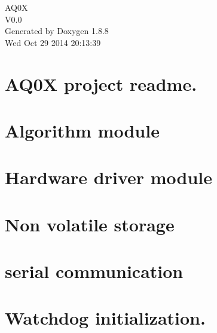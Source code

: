 \documentclass[twoside]{book}
\newcommand{\+}{\discretionary{\mbox{\scriptsize$\hookleftarrow$}}{}{}}
\newcommand{\clearemptydoublepage}{%
  \newpage{\pagestyle{empty}\cleardoublepage}%
}
\begin{document}
\hypersetup{pageanchor=false,
             bookmarks=true,
             bookmarksnumbered=true,
             pdfencoding=unicode
            }
\begin{titlepage}
\vspace*{7cm}
\begin{center}%
{\Large A\+Q0\+X \\[1ex]\large V0.\+0 }\\
\vspace*{1cm}
{\large Generated by Doxygen 1.8.8}\\
\vspace*{0.5cm}
{\small Wed Oct 29 2014 20:13:39}\\
\end{center}
\end{titlepage}
\clearemptydoublepage
\tableofcontents
\clearemptydoublepage
{}
\hypersetup{pageanchor=true}

\chapter{A\+Q0\+X project readme.}
\label{index}\hypertarget{index}{}
\chapter{Algorithm module}
\label{d7/d46/a00002}
\hypertarget{d7/d46/a00002}{}

\chapter{Hardware driver module}
\label{d0/d0b/a00004}
\hypertarget{d0/d0b/a00004}{}

\chapter{Non volatile storage}
\label{de/d21/a00006}
\hypertarget{de/d21/a00006}{}

\chapter{serial communication}
\label{d4/dee/a00008}
\hypertarget{d4/dee/a00008}{}

\chapter{Watchdog initialization.}
\label{d7/dec/a00010}
\hypertarget{d7/dec/a00010}{}

\end{document}
